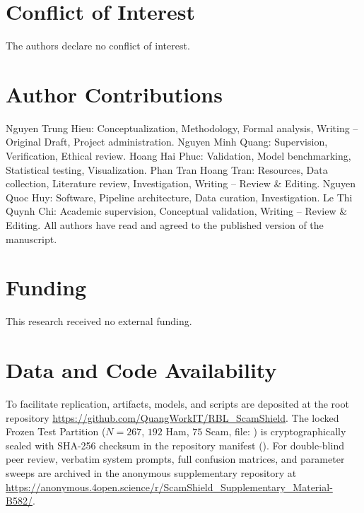 \section*{Conflict of Interest}
The authors declare no conflict of interest.

\section*{Author Contributions}
Nguyen Trung Hieu: Conceptualization, Methodology, Formal analysis, Writing -- Original Draft, Project administration.
Nguyen Minh Quang: Supervision, Verification, Ethical review.
Hoang Hai Phuc: Validation, Model benchmarking, Statistical testing, Visualization.
Phan Tran Hoang Tran: Resources, Data collection, Literature review, Investigation, Writing -- Review \& Editing.
Nguyen Quoc Huy: Software, Pipeline architecture, Data curation, Investigation.
Le Thi Quynh Chi: Academic supervision, Conceptual validation, Writing -- Review \& Editing.
All authors have read and agreed to the published version of the manuscript.

\section*{Funding}
This research received no external funding.

\section*{Data and Code Availability}
To facilitate replication, artifacts, models, and scripts are deposited at the root repository \url{https://github.com/QuangWorkIT/RBL_ScamShield}. The locked Frozen Test Partition ($N=267$, $192$ Ham, $75$ Scam, file: ) is cryptographically sealed with SHA-256 checksum  in the repository manifest (). For double-blind peer review, verbatim system prompts, full confusion matrices, and parameter sweeps are archived in the anonymous supplementary repository at \url{https://anonymous.4open.science/r/ScamShield_Supplementary_Material-B582/}.